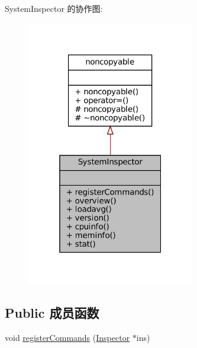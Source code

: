 System\+Inspector 的协作图\+:
\nopagebreak
\begin{figure}[H]
\begin{center}
\leavevmode
\includegraphics[width=208pt]{classmuduo_1_1net_1_1SystemInspector__coll__graph}
\end{center}
\end{figure}
\subsection*{Public 成员函数}
\begin{DoxyCompactItemize}
\item 
void \hyperlink{classmuduo_1_1net_1_1SystemInspector_ac4da0c5db63e529c730df0c77175882e}{register\+Commands} (\hyperlink{classmuduo_1_1net_1_1Inspector}{Inspector} $\ast$ins)
\end{DoxyCompactItemize}
